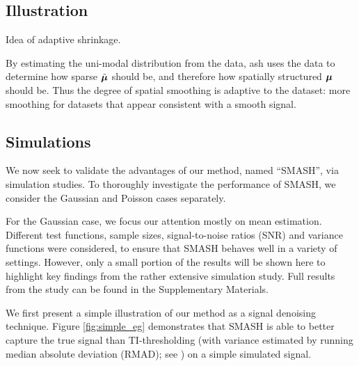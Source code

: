 \documentclass[12pt]{article}
\begin{document}
\subsection{Illustration}

Idea of adaptive shrinkage.

By estimating the uni-modal distribution from the data, ash uses the data to
determine how sparse $\tilde{\bm{\mu}}$ should be,
and therefore how spatially structured $\bm{\mu}$ should be. Thus the degree of spatial smoothing is adaptive to the dataset: more smoothing for
datasets that appear consistent with a smooth signal.

\subsection{Simulations}
We now seek to validate the advantages of our method, named ``SMASH'', via simulation studies. To thoroughly investigate the performance of SMASH, we consider the Gaussian and Poisson cases separately. 

For the Gaussian case, we focus our attention mostly on mean estimation. Different test functions, sample sizes, signal-to-noise ratios (SNR) and variance functions were considered, to ensure that SMASH behaves well in a variety of settings. However, only a small portion of the results will be shown here to highlight key findings from the rather extensive simulation study. Full results from the study can be found in the Supplementary Materials.

We first present a simple illustration of our method as a signal denoising technique. Figure \ref{fig:simple_eg} demonstrates that SMASH is able to better capture the true signal than TI-thresholding (with variance estimated by running median absolute deviation (RMAD); see \cite{Gao1997Wavelet}) on a simple simulated signal.  
\end{document}
